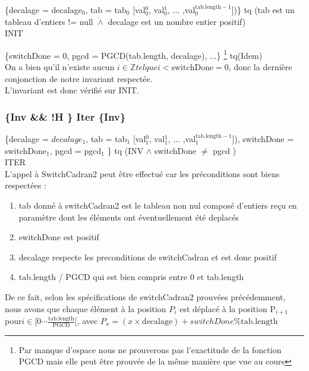 \{decalage = decalage$_{0}$, tab = tab$_{0}$ [val$_{0}^{0}$, val$_{0}^{1}$, ... ,val$_{0}^{\mathrm{tab.length}-1}$])\} tq (tab est un tableau d'entiers != null
$\dot{\wedge}$ decalage est un nombre entier positif)\\

INIT

\{switchDone = 0, pgcd = PGCD(tab.length, decalage), ...\} \footnote{Par manque d'espace nous ne prouverons pas l'exactitude de la fonction PGCD mais elle peut être prouvée de la même manière que vue au cours} tq(Idem)\\

On a bien qu'il n'existe aucun $i \in \mathbb{Z} tel que i< \mathrm{switchDone} = 0$, donc la dernière conjonction de notre invariant respectée. \\

L'invariant est donc vérifié sur INIT.

\subsubsection*{\{Inv \&\& !H \} Iter \{Inv\}}

\{decalage = $decalage_{1}$, tab = tab$_{1}$ [val$_{1}^{0}$, val$_{1}^{1}$, ... ,val$_{1}^{\mathrm{tab.length-1}}$]), switchDone = switchDone$_{1}$, pgcd = pgcd$_{1}$ \} tq (INV $\wedge$ switchDone $\neq$ pgcd )\\

ITER \\

L'appel à SwitchCadran2 peut être effectué car les préconditions sont biens respectées :
\begin{enumerate}
 \item tab donné à switchCadran2 est le tableau non nul composé d'entiers reçu en paramètre dont les éléments ont éventuellement été deplacés
 \item switchDone est positif
 \item decalage respecte les preconditions de switchCadran et est donc positif
 \item tab.length / PGCD qui est bien compris entre 0 et tab.length
\end{enumerate}


De ce fait, selon les spécifications de switchCadran2 prouvées précédemment, nous avons
que chaque élément à la position $P_{i}$  est déplacé à la position P$_{i+1}$ pour$ i \in [0\cdots
    \frac{\mathrm{tab.length}}{\mathrm{PGCD}}[$, avec $P_{x} = (x\times \mathrm{decalage})+switchDone \% \mathrm{tab.length}$\\

